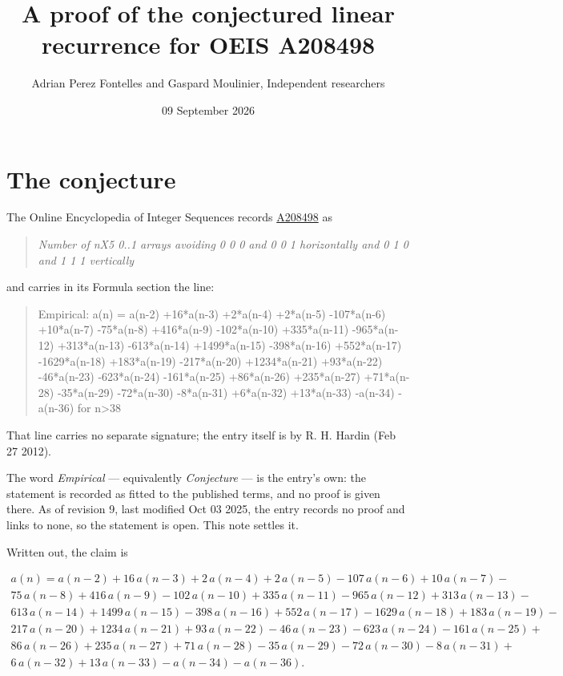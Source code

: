 \documentclass[11pt]{article}
\title{A proof of the conjectured linear recurrence for OEIS A208498}
\author{Adrian Perez Fontelles and Gaspard Moulinier, Independent researchers}
\date{09 September 2026}
\theoremstyle{definition}
\begin{document}
\maketitle
\section{The conjecture}

The Online Encyclopedia of Integer Sequences records \href{https://oeis.org/A208498}{A208498} as

\begin{quote}\itshape Number of nX5 0..1 arrays avoiding 0 0 0 and 0 0 1 horizontally and 0 1 0 and 1 1 1 vertically\end{quote}

and carries in its Formula section the line:

\begin{quote}\ttfamily Empirical: a(n) = a(n-2) +16*a(n-3) +2*a(n-4) +2*a(n-5) -107*a(n-6) +10*a(n-7) -75*a(n-8) +416*a(n-9) -102*a(n-10) +335*a(n-11) -965*a(n-12) +313*a(n-13) -613*a(n-14) +1499*a(n-15) -398*a(n-16) +552*a(n-17) -1629*a(n-18) +183*a(n-19) -217*a(n-20) +1234*a(n-21) +93*a(n-22) -46*a(n-23) -623*a(n-24) -161*a(n-25) +86*a(n-26) +235*a(n-27) +71*a(n-28) -35*a(n-29) -72*a(n-30) -8*a(n-31) +6*a(n-32) +13*a(n-33) -a(n-34) -a(n-36) for n>38\end{quote}

That line carries no separate signature; the entry itself is by R. H. Hardin (Feb 27 2012).

The word {\itshape Empirical} --- equivalently {\itshape Conjecture} --- is the entry's own: the statement is recorded as fitted to the published terms, and no proof is given there. As of revision 9, last modified Oct 03 2025, the entry records no proof and links to none, so the statement is open. This note settles it.

Written out, the claim is

\begin{multline*} a(n) = a(n-2) + 16\,a(n-3) + 2\,a(n-4) + 2\,a(n-5) - 107\,a(n-6) + 10\,a(n-7) - \\ 75\,a(n-8) + 416\,a(n-9) - 102\,a(n-10) + 335\,a(n-11) - 965\,a(n-12) + 313\,a(n-13) - \\ 613\,a(n-14) + 1499\,a(n-15) - 398\,a(n-16) + 552\,a(n-17) - 1629\,a(n-18) + 183\,a(n-19) - \\ 217\,a(n-20) + 1234\,a(n-21) + 93\,a(n-22) - 46\,a(n-23) - 623\,a(n-24) - 161\,a(n-25) + \\ 86\,a(n-26) + 235\,a(n-27) + 71\,a(n-28) - 35\,a(n-29) - 72\,a(n-30) - 8\,a(n-31) + \\ 6\,a(n-32) + 13\,a(n-33) - a(n-34) - a(n-36). \end{multline*}
\end{document}
